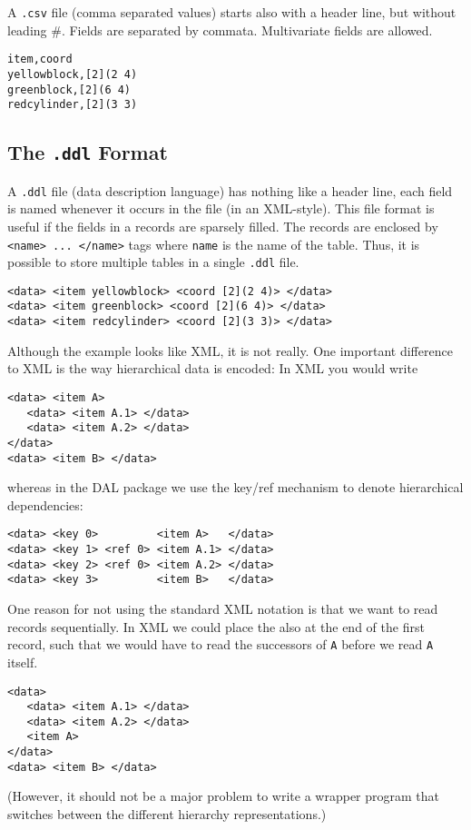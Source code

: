 \documentclass[a4paper]{book}
\begin{document}
A {\tt .csv} file (comma separated values) starts also with a header line, but
without leading \#. Fields are separated by commata. Multivariate fields are
allowed. 

\begin{verbatim}
item,coord 
yellowblock,[2](2 4)
greenblock,[2](6 4)
redcylinder,[2](3 3)
\end{verbatim}

\subsection{The {\tt .ddl} Format}

A {\tt .ddl} file (data description language) has nothing like a
header line, each field is named whenever it occurs in the file (in an
XML-style). This file format is useful if the fields in a records are
sparsely filled. The records are enclosed by {\tt <name> ... </name>}
tags where {\tt name} is the name of the table. Thus, it is possible
to store multiple tables in a single {\tt .ddl} file.

\begin{verbatim}
<data> <item yellowblock> <coord [2](2 4)> </data>
<data> <item greenblock> <coord [2](6 4)> </data>
<data> <item redcylinder> <coord [2](3 3)> </data>
\end{verbatim}

Although the example looks like XML, it is not really. One important
difference to XML is the way hierarchical data is encoded: In XML you
would write
\begin{verbatim}
<data> <item A> 
   <data> <item A.1> </data>
   <data> <item A.2> </data>
</data>
<data> <item B> </data>
\end{verbatim}
whereas in the DAL package we use the key/ref mechanism to denote
hierarchical dependencies:
\begin{verbatim}
<data> <key 0>         <item A>   </data>
<data> <key 1> <ref 0> <item A.1> </data>
<data> <key 2> <ref 0> <item A.2> </data>
<data> <key 3>         <item B>   </data>
\end{verbatim}
One reason for not using the standard XML notation is that we want to
read records sequentially. In XML we could place the {\tt <item A>}
also at the end of the first record, such that we would have to read
the successors of {\tt A} before we read {\tt A} itself.
\begin{verbatim}
<data>
   <data> <item A.1> </data>
   <data> <item A.2> </data>
   <item A> 
</data>
<data> <item B> </data>
\end{verbatim}
(However, it should not be a major problem to write a wrapper program
that switches between the different hierarchy representations.)
\end{document}
